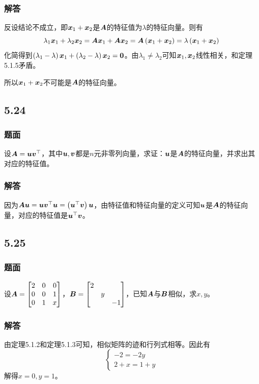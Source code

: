\documentclass{beamer}
\begin{document}
\begin{frame}
    \frametitle{解答}
    反设结论不成立，即\(\boldsymbol{x}_1+\boldsymbol{x}_2\)是\(\boldsymbol{A}\)的特征值为\(\lambda\)的特征向量。则有
    \begin{equation*}
        \lambda_1\boldsymbol{x}_1+\lambda_2\boldsymbol{x}_2=\boldsymbol{A}\boldsymbol{x}_1+\boldsymbol{A}\boldsymbol{x}_2=\boldsymbol{A}\left( \boldsymbol{x}_1+\boldsymbol{x}_2 \right)=\lambda\left( \boldsymbol{x}_1+\boldsymbol{x}_2 \right)
    \end{equation*}
    \pause
    化简得到\(\left( \lambda_1-\lambda \right)\boldsymbol{x}_1+\left( \lambda_2-\lambda \right)\boldsymbol{x}_2=\boldsymbol{0}\)。由\(\lambda_1\neq\lambda_2\)可知\(\boldsymbol{x}_1,\boldsymbol{x}_2\)线性相关，和定理5.1.5矛盾。

    所以\(\boldsymbol{x}_1+\boldsymbol{x}_2\)不可能是\(\boldsymbol{A}\)的特征向量。
\end{frame}

\subsection*{5.24}
\begin{frame}
    \frametitle{题面}
    设\(\boldsymbol{A}=\boldsymbol{u}\boldsymbol{v}^\top\)，其中\(\boldsymbol{u},\boldsymbol{v}\)都是\(n\)元非零列向量，求证：\(\boldsymbol{u}\)是\(\boldsymbol{A}\)的特征向量，并求出其对应的特征值。
\end{frame}

\begin{frame}
    \frametitle{解答}
    因为\(\boldsymbol{A}\boldsymbol{u}=\boldsymbol{u}\boldsymbol{v}^\top\boldsymbol{u}=\left( \boldsymbol{u}^\top\boldsymbol{v} \right)\boldsymbol{u}\)，由特征值和特征向量的定义可知\(\boldsymbol{u}\)是\(\boldsymbol{A}\)的特征向量，对应的特征值是\(\boldsymbol{u}^\top\boldsymbol{v}\)。
\end{frame}

\subsection*{5.25}
\begin{frame}
    \frametitle{题面}
    设\(\boldsymbol{A}=\begin{bmatrix}2&0&0\\0&0&1\\0&1&x\end{bmatrix}\)，\(\boldsymbol{B}=\begin{bmatrix}2&&\\&y&\\&&-1\end{bmatrix}\)，已知\(\boldsymbol{A}\)与\(\boldsymbol{B}\)相似，求\(x,y\)。
\end{frame}

\begin{frame}
    \frametitle{解答}
    由定理5.1.2和定理5.1.3可知，相似矩阵的迹和行列式相等。因此有
    \begin{equation*}
        \begin{cases}
            -2=-2y \\
            2+x=1+y
        \end{cases}
    \end{equation*}
    解得\(x=0,y=1\)。
\end{frame}
\end{document}
